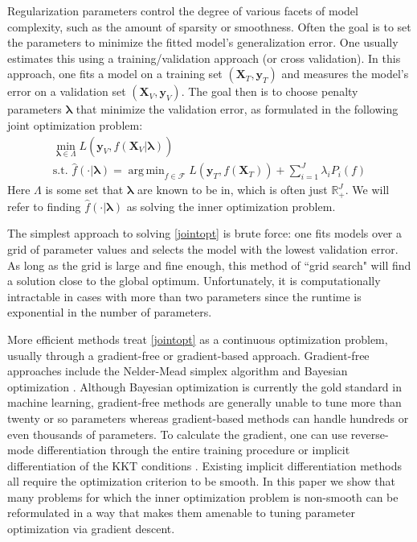\documentclass[12pt]{article}
\DeclareMathOperator*{\argmin}{arg\,min}
\begin{document}
Regularization parameters control the degree of various facets of model complexity, such as the amount of sparsity or smoothness. Often the goal is to set the parameters to minimize the fitted model's generalization error. One usually estimates this using a training/validation approach (or cross validation). In this approach, one fits a model on a training set $(\boldsymbol X_T, \boldsymbol y_T)$ and measures the model's error on a validation set $(\boldsymbol X_V, \boldsymbol y_V)$. The goal then is to choose penalty parameters $\boldsymbol{\lambda}$ that minimize the validation error, as formulated in the following joint optimization problem:
\begin{equation}
\begin{array}{c}
\min_{\boldsymbol{\lambda} \in \Lambda} L\left (\boldsymbol{y}_V, \hat f (\boldsymbol{X}_V | \boldsymbol{\lambda}) \right) \\
\text{s.t. } \hat f(\cdot | \boldsymbol{\lambda}) = \argmin_{f\in\mathcal{F}} L \left (\boldsymbol{y}_T, f (\boldsymbol{X}_T) \right) + \sum\limits_{i=1}^J \lambda_i P_i(f)
\end{array}
\label{jointopt}
\end{equation}
Here $\Lambda$ is some set that $\boldsymbol{\lambda}$ are known to be in, which is often just $\mathbb{R}^{J}_+$. We will refer to finding $\hat f (\cdot | \boldsymbol{\lambda})$ as solving the inner optimization problem.

The simplest approach to solving \eqref{jointopt} is brute force: one fits models over a grid of parameter values and selects the model with the lowest validation error. As long as the grid is large and fine enough, this method of ``grid search" will find a solution close to the global optimum. Unfortunately, it is computationally intractable in cases with more than two parameters since the runtime is exponential in the number of parameters.

More efficient methods treat \eqref{jointopt} as a continuous optimization problem, usually through a gradient-free or gradient-based approach. Gradient-free approaches include the Nelder-Mead simplex algorithm \citep{nelder1965simplex} and Bayesian optimization \citep{snoek2012practical, bergstra2011algorithms, hutter2011sequential}. Although Bayesian optimization is currently the gold standard in machine learning, gradient-free methods are generally unable to tune more than twenty or so parameters whereas gradient-based methods can handle hundreds or even thousands of parameters. To calculate the gradient, one can use reverse-mode differentiation through the entire training procedure \citep{maclaurin2015gradient} or implicit differentiation of the KKT conditions \citep{larsen1998adaptive, bengio2000gradient, foo2008efficient, lorbert2010descent}. Existing implicit differentiation methods all require the optimization criterion to be smooth. In this paper we show that many problems for which the inner optimization problem is non-smooth can be reformulated in a way that makes them amenable to tuning parameter optimization via gradient descent.
\end{document}
